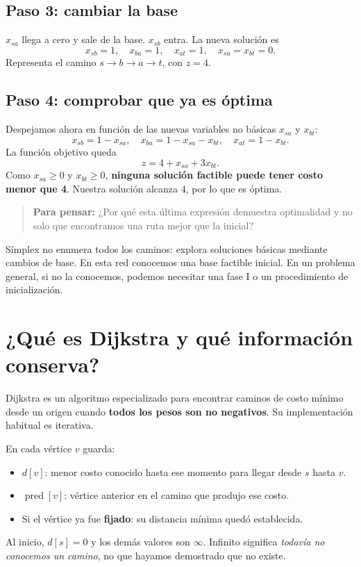 \documentclass[11pt,letterpaper]{article}
\newcommand{\pregunta}[1]{\begin{quote}\color{verde}\textbf{Para pensar:} #1\end{quote}}
\begin{document}
\subsection{Paso 3: cambiar la base}
$x_{sa}$ llega a cero y sale de la base. $x_{sb}$ entra. La nueva solución es
\[
x_{sb}=1,\quad x_{ba}=1,\quad x_{at}=1,\quad x_{sa}=x_{bt}=0.
\]
Representa el camino $s\to b\to a\to t$, con $z=4$.

\subsection{Paso 4: comprobar que ya es óptima}
Despejamos ahora en función de las nuevas variables no básicas $x_{sa}$ y $x_{bt}$:
\[
x_{sb}=1-x_{sa},\quad x_{ba}=1-x_{sa}-x_{bt},\quad x_{at}=1-x_{bt}.
\]
La función objetivo queda
\[
\boxed{z=4+x_{sa}+3x_{bt}.}
\]
Como $x_{sa}\geq0$ y $x_{bt}\geq0$, \textbf{ninguna solución factible puede tener costo menor que 4}. Nuestra solución alcanza 4, por lo que es óptima.
\pregunta{¿Por qué esta última expresión demuestra optimalidad y no solo que encontramos una ruta mejor que la inicial?}

Símplex no enumera todos los caminos: explora soluciones básicas mediante cambios de base. En esta red conocemos una base factible inicial. En un problema general, si no la conocemos, podemos necesitar una fase I o un procedimiento de inicialización.

\section{¿Qué es Dijkstra y qué información conserva?}
Dijkstra es un algoritmo especializado para encontrar caminos de costo mínimo desde un origen cuando \textbf{todos los pesos son no negativos}. Su implementación habitual es iterativa.

En cada vértice $v$ guarda:
\begin{itemize}
\item $d[v]$: menor costo conocido hasta ese momento para llegar desde $s$ hasta $v$.
\item $\operatorname{pred}[v]$: vértice anterior en el camino que produjo ese costo.
\item Si el vértice ya fue \textbf{fijado}: su distancia mínima quedó establecida.
\end{itemize}
Al inicio, $d[s]=0$ y los demás valores son $\infty$. Infinito significa \emph{todavía no conocemos un camino}, no que hayamos demostrado que no existe.
\end{document}

